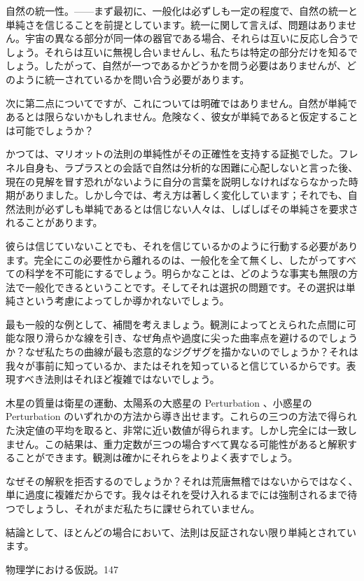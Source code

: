 \documentclass[a4paper,11pt,openany]{ltjsbook}
\begin{document}
自然の統一性。——まず最初に、一般化は必ずしも一定の程度で、自然の統一と単純さを信じることを前提としています。統一に関して言えば、問題はありません。宇宙の異なる部分が同一体の器官である場合、それらは互いに反応し合うでしょう。それらは互いに無視し合いませんし、私たちは特定の部分だけを知るでしょう。したがって、自然が一つであるかどうかを問う必要はありませんが、どのように統一されているかを問い合う必要があります。

次に第二点についてですが、これについては明確ではありません。自然が単純であるとは限らないかもしれません。危険なく、彼女が単純であると仮定することは可能でしょうか？

かつては、マリオットの法則の単純性がその正確性を支持する証拠でした。フレネル自身も、ラプラスとの会話で自然は分析的な困難に心配しないと言った後、現在の見解を冒す恐れがないように自分の言葉を説明しなければならなかった時期がありました。しかし今では、考え方は著しく変化しています；それでも、自然法則が必ずしも単純であるとは信じない人々は、しばしばその単純さを要求されることがあります。

彼らは信じていないことでも、それを信じているかのように行動する必要があります。完全にこの必要性から離れるのは、一般化を全て無くし、したがってすべての科学を不可能にするでしょう。明らかなことは、どのような事実も無限の方法で一般化できるということです。そしてそれは選択の問題です。その選択は単純さという考慮によってしか導かれないでしょう。

最も一般的な例として、補間を考えましょう。観測によってとえられた点間に可能な限り滑らかな線を引き、なぜ角点や過度に尖った曲率点を避けるのでしょうか？なぜ私たちの曲線が最も恣意的なジグザグを描かないのでしょうか？それは我々が事前に知っているか、またはそれを知っていると信じているからです。表現すべき法則はそれほど複雑ではないでしょう。

木星の質量は衛星の運動、太陽系の大惑星の Perturbation 、小惑星の Perturbation のいずれかの方法から導き出せます。これらの三つの方法で得られた決定値の平均を取ると、非常に近い数値が得られます。しかし完全には一致しません。この結果は、重力定数が三つの場合すべて異なる可能性があると解釈することができます。観測は確かにそれらをよりよく表すでしょう。

なぜその解釈を拒否するのでしょうか？それは荒唐無稽ではないからではなく、単に過度に複雑だからです。我々はそれを受け入れるまでには強制されるまで待つでしょうし、それがまだ私たちに課せられていません。

結論として、ほとんどの場合において、法則は反証されない限り単純とされています。

物理学における仮説。147
\end{document}
